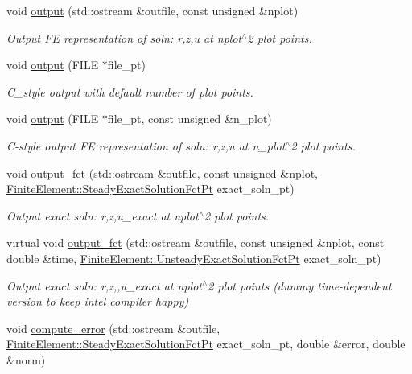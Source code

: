 \begin{DoxyCompactItemize}
void \hyperlink{namespaceoomph_ae53ff6c2852d72b8aa8801e40848e356}{output} (std\+::ostream \&outfile, const unsigned \&nplot)
\begin{DoxyCompactList}\small\item\em Output FE representation of soln\+: r,z,u at nplot$^\wedge$2 plot points. \end{DoxyCompactList}\item 
void \hyperlink{namespaceoomph_a37b4754a63827566176ebfc2f3a2c601}{output} (F\+I\+LE $\ast$file\+\_\+pt)
\begin{DoxyCompactList}\small\item\em C\+\_\+style output with default number of plot points. \end{DoxyCompactList}\item 
void \hyperlink{namespaceoomph_a3cb50c6adc7ee4a17c17a567b645f6db}{output} (F\+I\+LE $\ast$file\+\_\+pt, const unsigned \&n\+\_\+plot)
\begin{DoxyCompactList}\small\item\em C-\/style output FE representation of soln\+: r,z,u at n\+\_\+plot$^\wedge$2 plot points. \end{DoxyCompactList}\item 
void \hyperlink{namespaceoomph_af34df05c5bb9eca3576db493fb7d55ca}{output\+\_\+fct} (std\+::ostream \&outfile, const unsigned \&nplot, \hyperlink{classoomph_1_1FiniteElement_a690fd33af26cc3e84f39bba6d5a85202}{Finite\+Element\+::\+Steady\+Exact\+Solution\+Fct\+Pt} exact\+\_\+soln\+\_\+pt)
\begin{DoxyCompactList}\small\item\em Output exact soln\+: r,z,u\+\_\+exact at nplot$^\wedge$2 plot points. \end{DoxyCompactList}\item 
virtual void \hyperlink{namespaceoomph_a03bf88dd9de6857057781501ca5c066f}{output\+\_\+fct} (std\+::ostream \&outfile, const unsigned \&nplot, const double \&time, \hyperlink{classoomph_1_1FiniteElement_ad4ecf2b61b158a4b4d351a60d23c633e}{Finite\+Element\+::\+Unsteady\+Exact\+Solution\+Fct\+Pt} exact\+\_\+soln\+\_\+pt)
\begin{DoxyCompactList}\small\item\em Output exact soln\+: r,z,,u\+\_\+exact at nplot$^\wedge$2 plot points (dummy time-\/dependent version to keep intel compiler happy) \end{DoxyCompactList}\item 
void \hyperlink{namespaceoomph_ae99ee82405593cbf515785fa2116ec2a}{compute\+\_\+error} (std\+::ostream \&outfile, \hyperlink{classoomph_1_1FiniteElement_a690fd33af26cc3e84f39bba6d5a85202}{Finite\+Element\+::\+Steady\+Exact\+Solution\+Fct\+Pt} exact\+\_\+soln\+\_\+pt, double \&error, double \&norm)

\end{DoxyCompactItemize}
